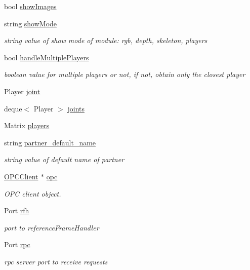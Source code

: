 \begin{DoxyCompactItemize}
\item 
bool \hyperlink{group__agentDetector_af4c907b2826df0adb81fcc3e6e794941}{show\+Images}
\item 
string \hyperlink{group__agentDetector_a3e8a7c80666869f36870a094b01e57f7}{show\+Mode}
\begin{DoxyCompactList}\small\item\em string value of show mode of module\+: rgb, depth, skeleton, players \end{DoxyCompactList}\item 
bool \hyperlink{group__agentDetector_a6c6335e325d46e248b870f902af0f276}{handle\+Multiple\+Players}
\begin{DoxyCompactList}\small\item\em boolean value for multiple players or not, if not, obtain only the closest player \end{DoxyCompactList}\item 
Player \hyperlink{group__agentDetector_a9cc73260275a9fed6733dba7f77d61cd}{joint}
\item 
deque$<$ Player $>$ \hyperlink{group__agentDetector_a675c7a91e1281572fdac3274585c0979}{joints}
\item 
Matrix \hyperlink{group__agentDetector_adfb0c0123ed2d62394c4dec7daed2aa8}{players}
\item 
string \hyperlink{group__agentDetector_a0636e8352e4746030c95f7eaac41658b}{partner\+\_\+default\+\_\+name}
\begin{DoxyCompactList}\small\item\em string value of default name of partner \end{DoxyCompactList}\item 
\hyperlink{group__icubclient__clients_classicubclient_1_1OPCClient}{O\+P\+C\+Client} $\ast$ \hyperlink{group__agentDetector_aa2eace7b8603a72863384e33de3da699}{opc}
\begin{DoxyCompactList}\small\item\em O\+PC client object. \end{DoxyCompactList}\item 
Port \hyperlink{group__agentDetector_add076c0ba22e85ce107773f11948d771}{rfh}
\begin{DoxyCompactList}\small\item\em port to reference\+Frame\+Handler \end{DoxyCompactList}\item 
Port \hyperlink{group__agentDetector_a522ec89dc04b6458a912cc2243abc113}{rpc}
\begin{DoxyCompactList}\small\item\em rpc server port to receive requests \end{DoxyCompactList}\item 

\end{DoxyCompactItemize}
